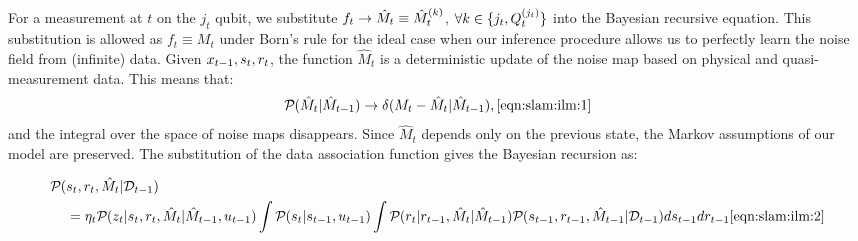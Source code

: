 For a measurement at $t$ on the $j_t$ qubit, we  substitute  $ f_{ t} \to \hat{M}_t \equiv \hat{M}_t^{(k)}$,  $ \forall k \in \{j_t, Q^{( j_t )}_{t}\}$ into the Bayesian recursive equation. This substitution is allowed as $f_t \equiv M_t$ under Born's rule for the ideal case when our inference procedure allows us to perfectly learn the noise field from (infinite) data. Given $x_{t-1}, s_{ t}, r_{ t}$, the function $\hat{M}_t$ is a deterministic update of the noise map based on physical and quasi-measurement data. This means that:
\begin{align}
	\prob{}{ \hat{M}_t| \hat{M}_{t-1}}  \to \delta (M_t - \hat{M}_t| \hat{M}_{t-1}),  \cref{eqn:slam:ilm:1}
\end{align} and the integral over the space of noise maps disappears. Since $\hat{M}_t$ depends only on the previous state, the Markov assumptions of our model are preserved. The substitution of the data association function gives the Bayesian recursion as:
\begin{widetext}
\begin{align}
\prob{}{&\pose{t}, \rstate{t}, \hat{M}_{t}| \mathcal{D}_{t-1}} \nonumber \\
& =  \eta_t\prob{}{z_t | \pose{t}, \rstate{t}, \hat{M}_t| \hat{M}_{t-1}, u_{t-1}}  \int \prob{}{ \pose{t}| \pose{t-1}, u_{t-1}} \int \prob{}{ \rstate{t}|  \rstate{t-1}, \hat{M}_t| \hat{M}_{t-1}} \prob{}{\pose{t-1}, \rstate{t-1}, \hat{M}_{t-1}| \mathcal{D}_{t-1}}  d\pose{t-1} d\rstate{t-1} \cref{eqn:slam:ilm:2}
\end{align}
\end{widetext} 
